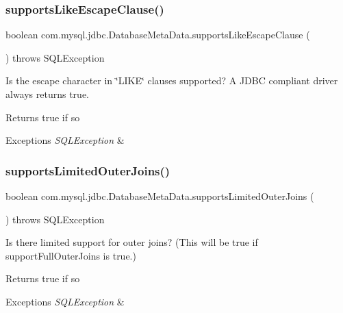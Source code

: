 \subsubsection{\texorpdfstring{supports\+Like\+Escape\+Clause()}{supportsLikeEscapeClause()}}
{\footnotesize\ttfamily boolean com.\+mysql.\+jdbc.\+Database\+Meta\+Data.\+supports\+Like\+Escape\+Clause (\begin{DoxyParamCaption}{ }\end{DoxyParamCaption}) throws S\+Q\+L\+Exception}

Is the escape character in \char`\"{}\+L\+I\+K\+E\char`\"{} clauses supported? A J\+D\+BC compliant driver always returns true.

\begin{DoxyReturn}{Returns}
true if so 
\end{DoxyReturn}

\begin{DoxyExceptions}{Exceptions}
{\em S\+Q\+L\+Exception} & \\
\hline
\end{DoxyExceptions}
\mbox{\label{classcom_1_1mysql_1_1jdbc_1_1_database_meta_data_a3836a4ce22bb62ebd86dcd3f34c5d9dc}} 
\subsubsection{\texorpdfstring{supports\+Limited\+Outer\+Joins()}{supportsLimitedOuterJoins()}}
{\footnotesize\ttfamily boolean com.\+mysql.\+jdbc.\+Database\+Meta\+Data.\+supports\+Limited\+Outer\+Joins (\begin{DoxyParamCaption}{ }\end{DoxyParamCaption}) throws S\+Q\+L\+Exception}

Is there limited support for outer joins? (This will be true if support\+Full\+Outer\+Joins is true.)

\begin{DoxyReturn}{Returns}
true if so 
\end{DoxyReturn}

\begin{DoxyExceptions}{Exceptions}
{\em S\+Q\+L\+Exception} & \\
\hline
\end{DoxyExceptions}
\mbox{\label{classcom_1_1mysql_1_1jdbc_1_1_database_meta_data_adff3fdeb8e6082efd47c296abbab9516}} 

